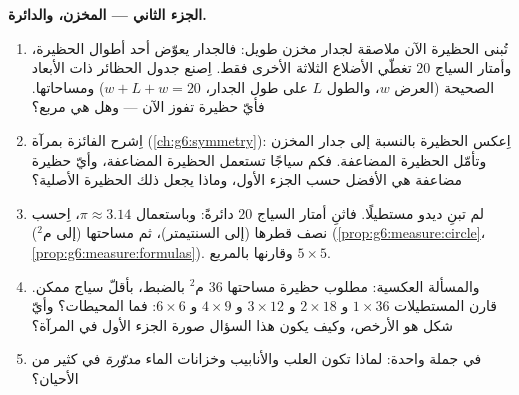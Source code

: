 \begin{problem}
\medskip
\noindent\textbf{الجزء الثاني --- المخزن، والدائرة.}
\begin{enumerate}[resume]
  \item تُبنى الحظيرة الآن ملاصقة لجدار مخزن طويل: فالجدار
        يعوّض أحد أطوال الحظيرة، وأمتار السياج $20$
        تغطّي الأضلاع الثلاثة الأخرى فقط. اِصنع جدول
        الحظائر ذات الأبعاد الصحيحة (العرض $w$، والطول $L$ على طول الجدار،
        $w + L + w = 20$) ومساحاتها. فأيّ حظيرة تفوز الآن ---
        وهل هي مربع؟
  \item اِشرح الفائزة بمرآة
        (\cref{ch:g6:symmetry}): اِعكس الحظيرة بالنسبة إلى جدار
        المخزن وتأمّل الحظيرة المضاعفة. فكم سياجًا
        تستعمل الحظيرة المضاعفة، وأيّ حظيرة مضاعفة هي الأفضل حسب الجزء الأول،
        وماذا يجعل ذلك الحظيرة الأصلية؟
  \item لم تبنِ ديدو مستطيلًا. فاثنِ أمتار السياج $20$
        دائرةً: وباستعمال $\pi \approx 3.14$، اِحسب
        نصف قطرها (إلى السنتيمتر)، ثم مساحتها (إلى م$^2$)
        (\cref{prop:g6:measure:circle}،
        \cref{prop:g6:measure:formulas}). وقارنها بالمربع
        $5 \times 5$.
  \item والمسألة العكسية: مطلوب حظيرة مساحتها $36$ م$^2$
        بالضبط، بأقلّ سياج ممكن. قارن
        المستطيلات $1 \times 36$ و $2 \times 18$ و $3 \times 12$
        و $4 \times 9$ و $6 \times 6$: فما المحيطات؟ وأيّ شكل
        هو الأرخص، وكيف يكون هذا السؤال صورة الجزء الأول
        في المرآة؟
  \item في جملة واحدة: لماذا تكون العلب والأنابيب وخزانات الماء
        \emph{مدوّرة} في كثير من الأحيان؟
\end{enumerate}


\end{problem}

